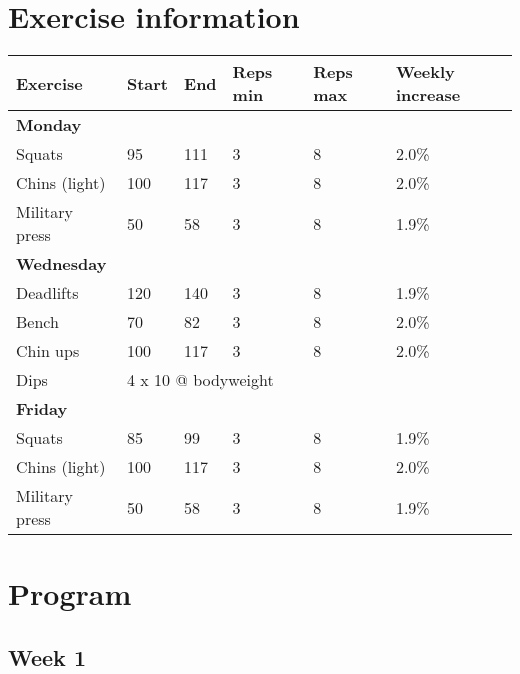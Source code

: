 \documentclass[12pt, a4paper]{article}%
\begin{document}
\section*{Exercise information}
\begin{tabular}{llllll}
    \textbf{Exercise} & \textbf{Start} & \textbf{End} & \textbf{Reps min}
    & \textbf{Reps max} & \textbf{Weekly increase} \\ \hline
      \textbf{ Monday } & & & & & \\ \hline
        \hspace{0.5em}Squats & 95  &
         111  & 3 & 8 &
          2.0\%\\
        \hspace{0.5em}Chins (light) & 100  &
         117  & 3 & 8 &
          2.0\%\\
        \hspace{0.5em}Military press & 50  &
         58  & 3 & 8 &
          1.9\%\\
      \textbf{ Wednesday } & & & & & \\ \hline
        \hspace{0.5em}Deadlifts & 120  &
         140  & 3 & 8 &
          1.9\%\\
        \hspace{0.5em}Bench & 70  &
         82  & 3 & 8 &
          2.0\%\\
        \hspace{0.5em}Chin ups & 100  &
         117  & 3 & 8 &
          2.0\%\\
       \hspace{0.5em}Dips & \multicolumn{ 5 }{l}{ 4 x 10 @ bodyweight } \\
      \textbf{ Friday } & & & & & \\ \hline
        \hspace{0.5em}Squats & 85  &
         99  & 3 & 8 &
          1.9\%\\
        \hspace{0.5em}Chins (light) & 100  &
         117  & 3 & 8 &
          2.0\%\\
        \hspace{0.5em}Military press & 50  &
         58  & 3 & 8 &
          1.9\%\\
\end{tabular}


\clearpage
\section*{Program}
 \subsection*{\hspace{0.25em} Week 1 }
\end{document}
